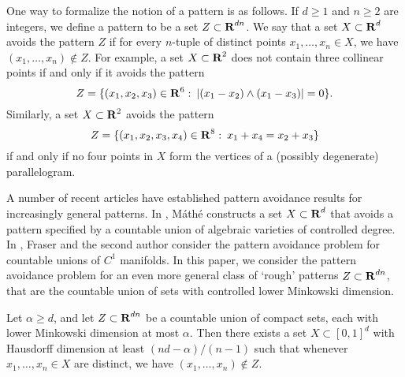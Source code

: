 One way to formalize the notion of a pattern is as follows. If $d \geq 1$ and $n \geq 2$ are integers, we define a pattern to be a set $Z \subset \operatorname{\mathbf{R}}^{dn}$. We say that a set $X \subset \operatorname{\mathbf{R}}^d$ avoids the pattern $Z$ if for every $n$-tuple of distinct points $x_1, \ldots, x_n\in X$, we have $(x_1,\ldots,x_n) \not \in Z$. For example, a set $X \subset \operatorname{\mathbf{R}}^2$ does not contain three collinear points if and only if it avoids the pattern
%
\[ Z = \{ (x_1,x_2,x_3) \in \operatorname{\mathbf{R}}^{6} \operatorname{\colon} |(x_1-x_2)\wedge (x_1-x_3)|=0\}. \]
%
Similarly, a set $X \subset \operatorname{\mathbf{R}}^2$ avoids the pattern
%
\[ Z = \{ (x_1, x_2,x_3,x_4) \in \operatorname{\mathbf{R}}^8 \operatorname{\colon} x_1 + x_4 = x_2 + x_3 \} \]
%
if and only if no four points in $X$ form the vertices of a (possibly degenerate) parallelogram.

A number of recent articles have established pattern avoidance results for increasingly general patterns. In \cite{Mathe}, M\'{a}th\'{e} constructs a set $X\subset\operatorname{\mathbf{R}}^d$ that avoids a pattern specified by a countable union of algebraic varieties of controlled degree. In \cite{MalabikaRob}, Fraser and the second author consider the pattern avoidance problem for countable unions of $C^1$ manifolds. In this paper, we consider the pattern avoidance problem for an even more general class of `rough' patterns $Z \subset \operatorname{\mathbf{R}}^{dn}$, that are the countable union of sets with controlled lower Minkowski dimension.
%

\begin{theorem}\label{mainTheorem}
	Let $\alpha \geq d$, and let $Z \subset \operatorname{\mathbf{R}}^{dn}$ be a countable union of compact sets, each with lower Minkowski dimension at most $\alpha$. Then there exists a set $X \subset [0,1]^d$ with Hausdorff dimension at least $(nd - \alpha)/(n-1)$ such that whenever $x_1, \dots, x_n \in X$ are distinct, we have $(x_1, \dots, x_n) \not \in Z$.
\end{theorem}

